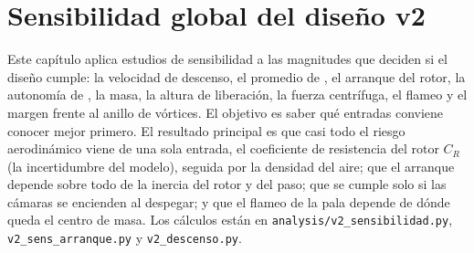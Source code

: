 \chapter{Sensibilidad global del diseño v2}\label{cap:sens}

Este capítulo aplica estudios de sensibilidad a las magnitudes que deciden si el diseño
cumple: la velocidad de descenso, el promedio de , el arranque del rotor, la
autonomía de , la masa, la altura de liberación, la fuerza centrífuga, el flameo y el
margen frente al anillo de vórtices. El objetivo es saber qué entradas conviene conocer mejor
primero. El resultado principal es que casi todo el riesgo aerodinámico viene de una sola
entrada, el coeficiente de resistencia del rotor $C_R$ (la incertidumbre del modelo), seguida
por la densidad del aire; que el arranque depende sobre todo de la inercia del rotor y del
paso; que  se cumple solo si las cámaras se encienden al despegar; y que el flameo de la
pala depende de dónde queda el centro de masa. Los cálculos están en
\texttt{analysis/v2\_sensibilidad.py}, \texttt{v2\_sens\_arranque.py} y
\texttt{v2\_descenso.py}.

